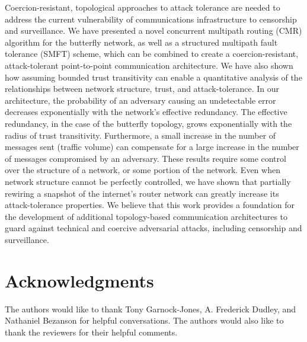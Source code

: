 \documentclass[10pt,letterpaper]{article}
\begin{document}
Coercion-resistant, topological approaches to attack tolerance are needed to
address the current vulnerability of communications infrastructure to
censorship and surveillance.
We have presented a novel concurrent multipath routing (CMR)
algorithm for the butterfly network,
as well as a structured multipath fault tolerance (SMFT) scheme,
which can be combined to create a coercion-resistant,
attack-tolerant point-to-point communication architecture.
We have also shown how assuming bounded trust
transitivity can enable a quantitative analysis of the
relationships between network structure, trust, and attack-tolerance.
In our architecture,
the probability of an adversary causing an undetectable error
decreases exponentially with the network's effective redundancy.
The effective redundancy, in the case of the butterfly topology,
grows exponentially with the radius of trust transitivity.
Furthermore, a small increase in the number of messages sent
(traffic volume) can compensate
for a large increase in the number of messages compromised by an adversary.
These results require some control over the structure of a network,
or some portion of the network.
Even when network structure cannot be perfectly controlled,
we have shown that partially rewiring a snapshot of the internet's router network
can greatly increase its attack-tolerance properties.
We believe that this work provides a foundation for the
development of additional topology-based communication
architectures to guard against technical and coercive adversarial attacks,
including censorship and surveillance.

\section*{Acknowledgments}
The authors would like to thank Tony Garnock-Jones, A. Frederick Dudley, and
Nathaniel Bezanson for helpful conversations.
The authors would also like to thank the reviewers for their helpful comments.

\nolinenumbers

%
\end{document}

